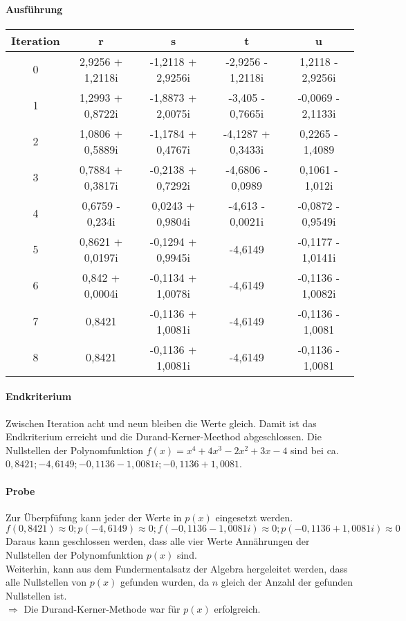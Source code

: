 \documentclass[12pt]{article}
\begin{document}
\paragraph{Ausführung}
\begin{center}
\begin{tabular}{c|c c c c}
    Iteration & r & s & t & u \\
    \hline
    0 & 2,9256 + 1,2118i & -1,2118 + 2,9256i & -2,9256 - 1,2118i & 1,2118 - 2,9256i \\
    1 & 1,2993 + 0,8722i & -1,8873 + 2,0075i & -3,405 - 0,7665i & -0,0069 - 2,1133i \\
    2 & 1,0806 + 0,5889i & -1,1784 + 0,4767i & -4,1287 + 0,3433i & 0,2265 - 1,4089 \\
    3 & 0,7884 + 0,3817i & -0,2138 + 0,7292i & -4,6806 - 0,0989 & 0,1061 - 1,012i \\
    4 & 0,6759 - 0,234i & 0,0243 + 0,9804i & -4,613 - 0,0021i & -0,0872 - 0,9549i \\
    5 & 0,8621 + 0,0197i & -0,1294 + 0,9945i & -4,6149 & -0,1177 - 1,0141i \\
    6 & 0,842 + 0,0004i & -0,1134 + 1,0078i & -4,6149 & -0,1136 - 1,0082i \\
    7 & 0,8421 & -0,1136 + 1,0081i & -4,6149 & -0,1136 - 1,0081 \\
    8 & 0,8421 & -0,1136 + 1,0081i & -4,6149 & -0,1136 - 1,0081 \\
\end{tabular}
\end{center}
\paragraph{Endkriterium}
Zwischen Iteration acht und neun bleiben die Werte gleich. Damit ist das Endkriterium erreicht und die Durand-Kerner-Meethod abgeschlossen. 
Die Nullstellen der Polynomfunktion $f(x) = x^4 + 4x^3 - 2x^2 + 3x - 4$ sind bei ca. $0,8421; -4,6149; -0,1136 - 1,0081i; -0,1136 + 1,0081$. 
\paragraph{Probe}
Zur Überpfüfung kann jeder der Werte in $p(x)$ eingesetzt werden.
\begin{displaymath}
    f(0,8421) \approx 0; p(-4,6149) \approx 0; f(-0,1136 - 1,0081i) \approx 0; p(-0,1136 + 1,0081i) \approx 0
\end{displaymath}
Daraus kann geschlossen werden, dass alle vier Werte Annährungen der Nullstellen der Polynomfunktion $p(x)$ sind. \\
Weiterhin, kann aus dem Fundermentalsatz der Algebra hergeleitet werden, dass alle Nullstellen von $p(x)$ gefunden wurden, da $n$ gleich der Anzahl der gefunden Nullstellen ist. \\
$\Rightarrow$ Die Durand-Kerner-Methode war für $p(x)$ erfolgreich.
\end{document}
